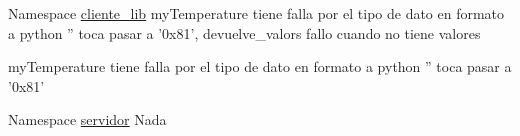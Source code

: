 \label{bug__bug000001}
\hypertarget{bug__bug000001}{}
 
\begin{DoxyDescription}
\item[Namespace \hyperlink{namespacecliente__lib}{cliente\_\-lib} ]myTemperature tiene falla por el tipo de dato en formato a python '' toca pasar a '0x81', devuelve\_\-valors fallo cuando no tiene valores 

myTemperature tiene falla por el tipo de dato en formato a python '' toca pasar a '0x81' 
\end{DoxyDescription}

\label{bug__bug000003}
\hypertarget{bug__bug000003}{}
 
\begin{DoxyDescription}
\item[Namespace \hyperlink{namespaceservidor}{servidor} ]Nada 
\end{DoxyDescription}